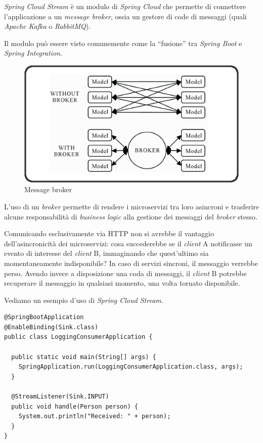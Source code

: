 \textit{Spring Cloud Stream} è un modulo di \textit{Spring Cloud} che permette di connettere l'applicazione a un \textit{message broker},
ossia un gestore di code di messaggi (quali \textit{Apache Kafka} o \textit{RabbitMQ}).

Il modulo può essere visto comunemente come la ``fusione'' tra \textit{Spring Boot} e \textit{Spring Integration}.

\begin{figure}[H]
	\centering
	\includegraphics[width=\textwidth]{immagini/message-broker.png}
	\caption[Message broker]{Message broker\footnotemark}
	\label{message-broker}
\end{figure}

L'uso di un \textit{broker} permette di rendere i microservizi tra loro asincroni e trasferire alcune responsabilità di \textit{business logic} alla gestione dei messaggi del \textit{broker} stesso.

Comunicando esclusivamente via HTTP non si avrebbe il vantaggio dell'asincronicità dei microservizi: cosa succederebbe se il \textit{client} A notificasse un evento di interesse del \textit{client} B, immaginando che quest'ultimo sia momentaneamente indisponibile?
In caso di servizi sincroni, il messaggio verrebbe perso. Avendo invece a disposizione una coda di messaggi, il \textit{client} B potrebbe recuperare il messaggio in qualsiasi momento, una volta tornato disponibile.

Vediamo un esempio d'uso di \textit{Spring Cloud Stream}.
\begin{tcolorbox}
	\begin{lstlisting}
@SpringBootApplication
@EnableBinding(Sink.class)
public class LoggingConsumerApplication {

  public static void main(String[] args) {
    SpringApplication.run(LoggingConsumerApplication.class, args);
  }

  @StreamListener(Sink.INPUT)
  public void handle(Person person) {
    System.out.println("Received: " + person);
  }
}
	\end{lstlisting}
\end{tcolorbox}

